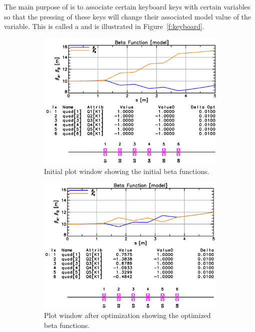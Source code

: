 \documentclass{hitec}     %
\begin{document}
{The main purpose of  is to associate certain keyboard keys with certain variables so that
the pressing of these keys will change their associated model value of the variable. This is called
a  and is illustrated in Figure~\ref{f:keyboard}.

\begin{figure}
  \centering
  \begin{subfigure}[t]{0.48\textwidth}
    \includegraphics[width=\textwidth]{opt0.pdf}
    \caption{Initial plot window showing the initial beta functions.}
    \label{f:opt0}
  \end{subfigure}
  \hfil
  \begin{subfigure}[t]{0.48\textwidth}
    \includegraphics[width=\textwidth]{opt1.pdf}
    \caption{Plot window after optimization showing the optimized beta functions.}
    \label{f:opt1}
  \end{subfigure}
  \caption{}
\end{figure}

}
\end{document}
